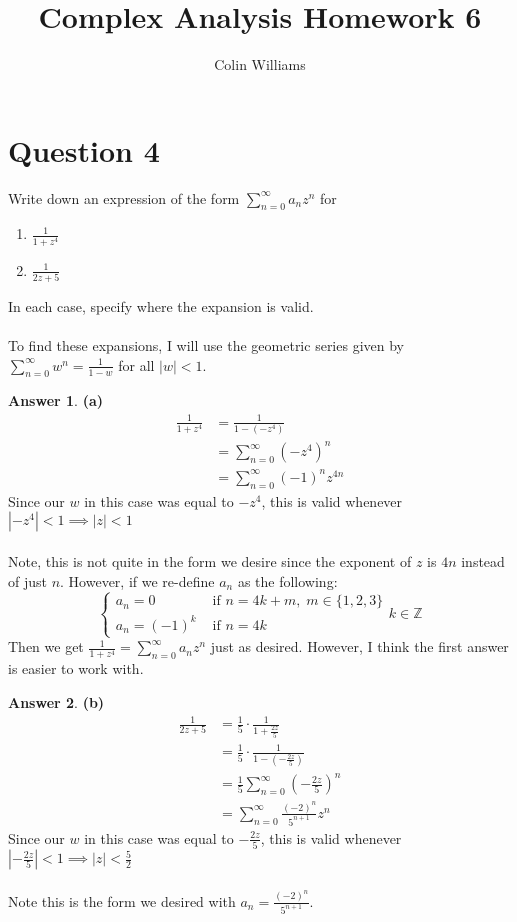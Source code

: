 \documentclass[10pt,a4paper]{article}
\title{Complex Analysis Homework 6}
\author{Colin Williams}
\theoremstyle{definition}
\newtheorem*{answer*}{Answer}
\begin{document}
\maketitle

\section*{Question 4}
Write down an expression of the form $\displaystyle \sum_{n = 0}^{\infty} a_nz^n$ for 
\begin{enumerate}[label = (\alph*)]
\item $\displaystyle \frac{1}{1 + z^4}$
\item $\displaystyle \frac{1}{2z + 5}$
\end{enumerate}
In each case, specify where the expansion is valid.
\\
\\To find these expansions, I will use the geometric series given by 
$\displaystyle \sum_{n = 0}^{\infty}w^n = \frac{1}{1 - w}$
for all $|w| < 1$.

\begin{answer*}{\textbf{(a)}}
\begin{align*}
\frac{1}{1 + z^4} &= \frac{1}{1 - (-z^4)}\\
&= \sum_{n = 0}^{\infty} (-z^4)^n\\
&= \boxed{\sum_{n = 0}^{\infty} (-1)^nz^{4n}}
\end{align*}
Since our $w$ in this case was equal to $-z^4$, this is valid whenever $|-z^4| < 1 \implies \boxed{|z| < 1}$
\\
\\Note, this is not quite in the form we desire since the exponent of $z$ is $4n$ instead of just $n$. However, if we re-define $a_n$ as the following:
\[
\begin{cases}
	a_n = 0 &\text{ if } n = 4k + m,\; m \in \{1,2,3\}\\
	a_n = (-1)^{k} &\text{ if } n = 4k
\end{cases}k \in \mathbb{Z}
\]
Then we get $\displaystyle \frac{1}{1 + z^4} = \sum_{n = 0}^{\infty} a_n z^n$ just as desired. However, I think the first answer is easier to work with.
\end{answer*}

\begin{answer*}{\textbf{(b)}}
\begin{align*}
\frac{1}{2z + 5} &= \frac{1}{5}\cdot \frac{1}{\displaystyle 1 + \frac{2z}{5}}\\
&= \frac{1}{5} \cdot \frac{1}{\displaystyle 1 - \left(-\frac{2z}{5}\right)}\\
&= \frac{1}{5}\sum_{n = 0}^{\infty} \left(-\frac{2z}{5}\right)^n\\
&= \boxed{\sum_{n = 0}^{\infty} \frac{(-2)^n}{5^{n+1}}z^n}
\end{align*}
Since our $w$ in this case was equal to $-\frac{2z}{5}$, this is valid whenever $\left|-\frac{2z}{5}\right| < 1 \implies \boxed{|z| < \frac{5}{2}}$
\\
\\Note this is the form we desired with $\displaystyle a_n = \frac{(-2)^n}{5^{n+1}}$.
\end{answer*}
\end{document}
